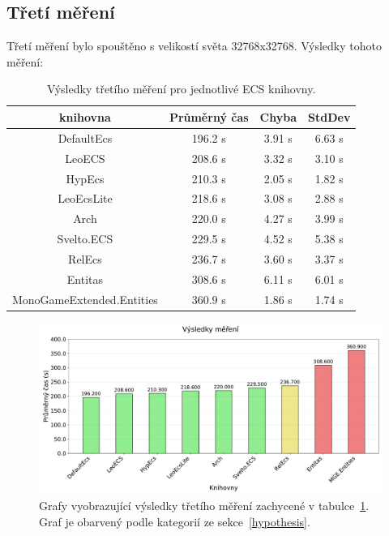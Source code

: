 \subsection{Třetí měření}
Třetí měření bylo spouštěno s velikostí světa 32768x32768. Výsledky tohoto měření:

\begin{table}[!htb]
    \centering\footnotesize\sf
    \begin{tabular}{c c c c}
        \toprule
        knihovna & Průměrný čas & Chyba & StdDev \\
        \midrule
        DefaultEcs & 196.2 s & 3.91 s & 6.63 s \\
        LeoECS & 208.6 s & 3.32 s & 3.10 s \\
        HypEcs & 210.3 s & 2.05 s & 1.82 s \\
        LeoEcsLite & 218.6 s & 3.08 s & 2.88 s \\
        Arch & 220.0 s & 4.27 s & 3.99 s \\
        Svelto.ECS & 229.5 s & 4.52 s & 5.38 s \\
        RelEcs & 236.7 s & 3.60  s & 3.37 s \\
        Entitas & 308.6 s &6.11 s & 6.01 s \\
        MonoGameExtended.Entities & 360.9 s & 1.86 s & 1.74 s \\
        \bottomrule
    \end{tabular}
    \caption{Výsledky třetího měření pro jednotlivé ECS knihovny.}
    \label{tab:third-benchmark-results}
\end{table}

\begin{figure}[!htb]
    \centering
    \includegraphics[width=1.0\linewidth]{plots/third_benchmark_results.pdf}
    \caption{Grafy vyobrazující výsledky třetího měření zachycené v tabulce~\ref{tab:third-benchmark-results}. Graf je obarvený podle kategorií ze sekce~\ref{hypothesis}.}
    \label{fig:third-benchmark-results}
\end{figure}

